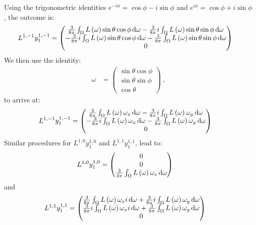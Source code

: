 Using the trigonometric identities $e^{-i\phi} = \operatorname{cos}\phi - i\operatorname{sin}\phi$ and $e^{i\phi} = \operatorname{cos}\phi + i\operatorname{sin}\phi$, the outcome is:
\begin{align}
L^{1,-1}y^{1,-1}_1 &= 
\begin{pmatrix}
\frac{3}{8\pi}\int_\Omega{L\left(\omega\right)\operatorname{sin}\theta\operatorname{cos}\phi\,\mathrm{d}\omega} - \frac{3}{8\pi}i\int_\Omega{L\left(\omega\right)\operatorname{sin}\theta\operatorname{sin}\phi\,\mathrm{d}\omega}
\\
-\frac{3}{8\pi}i\int_\Omega{L\left(\omega\right)\operatorname{sin}\theta\operatorname{cos}\phi\,\mathrm{d}\omega} - \frac{3}{8\pi}\int_\Omega{L\left(\omega\right)\operatorname{sin}\theta\operatorname{sin}\phi\,\mathrm{d}\omega}
\\
0
\end{pmatrix}
\end{align}
We then use the identity:
\begin{align}
\omega &= 
\begin{pmatrix}
\operatorname{sin}\theta\operatorname{cos}\phi
\\
\operatorname{sin}\theta\operatorname{sin}\phi
\\
\operatorname{cos}\theta
\end{pmatrix}\ ,
\end{align}
to arrive at:
\begin{align}
L^{1,-1}y^{1,-1}_1 &= 
\begin{pmatrix}
\frac{3}{8\pi}\int_\Omega{L\left(\omega\right)\omega_x\,\mathrm{d}\omega} - \frac{3}{8\pi}i\int_\Omega{L\left(\omega\right)\omega_y\,\mathrm{d}\omega}
\\
-\frac{3}{8\pi}i\int_\Omega{L\left(\omega\right)\omega_x\,\mathrm{d}\omega} - \frac{3}{8\pi}\int_\Omega{L\left(\omega\right)\omega_y\,\mathrm{d}\omega}
\\
0
\end{pmatrix}
\end{align}
Similar procedures for $L^{1,0}y^{1,0}_1$ and $L^{1,1}y^{1,1}_1$, lead to:
\begin{align}
L^{1,0}y^{1,0}_1 &= 
\begin{pmatrix}
0\\
0\\
\frac{3}{4\pi}\int_\Omega{L\left(\omega\right)\omega_z\,\mathrm{d}\omega}
\end{pmatrix}
\end{align}
and
\begin{align}
L^{1,1}y^{1,1}_1 &= 
\begin{pmatrix}
\frac{3}{8\pi}\int_\Omega{L\left(\omega\right)\omega_xi\,\mathrm{d}\omega} + \frac{3}{8\pi}i\int_\Omega{L\left(\omega\right)\omega_y\,\mathrm{d}\omega}
\\
\frac{3}{8\pi}i\int_\Omega{L\left(\omega\right)\omega_xi\,\mathrm{d}\omega} + \frac{3}{8\pi}\int_\Omega{L\left(\omega\right)\omega_y\,\mathrm{d}\omega}
\\
0
\end{pmatrix}
\end{align}

